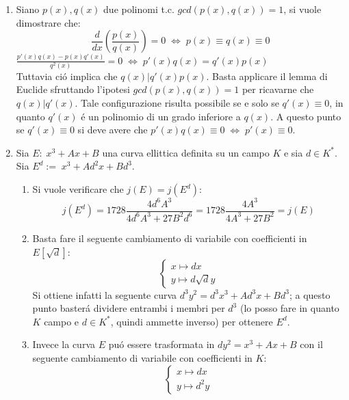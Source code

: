 \documentclass[a4paper]{article}
\newcommand{\sist}{\begin{cases}}
\newcommand{\esist}{\end{cases}}
\newcommand{\ds}{\displaystyle}
\begin{document}
\begin{enumerate}
\item Siano $p(x),q(x)$ due polinomi t.c. $gcd(p(x),q(x))=1$, si vuole dimostrare che:
$$\ds{\frac{d}{dx}\left(\frac{p(x)}{q(x)}\right)=0\;\Leftrightarrow\;p(x)\equiv q(x)\equiv 0}$$
$\ds{\frac{p'(x)q(x)-p(x)q'(x)}{q^2(x)}=0\;\Leftrightarrow\;p'(x)q(x)=q'(x)p(x)}$\\
Tuttavia ci\'o implica che $q(x)|q'(x)p(x)$. Basta applicare il lemma di Euclide sfruttando l'ipotesi $gcd(p(x),q(x))=1$ per ricavarne che $q(x)|q'(x)$. Tale configurazione risulta possibile se e solo se $q'(x)\equiv 0$, in quanto $q'(x)$ \'e un polinomio di un grado inferiore a $q(x)$. A questo punto se $q'(x)\equiv 0$ si deve avere che $p'(x)q(x) \equiv 0 \;\Leftrightarrow\; p'(x)\equiv 0$.\\ 


\item Sia $E:\; x^3+Ax+B$ una curva ellittica definita su un campo $K$ e sia $d\in K^{*}$.\\
Sia $E^d:=\; x^3+Ad^2x+Bd^3$.\\
\begin{enumerate}
\item Si vuole verificare che $j(E)=j(E^{d})$:
$$\ds{j(E^d)=1728\frac{4d^6A^3}{4d^6A^3+27B^2d^6}=1728\frac{4A^3}{4A^3+27B^2}=j(E)}$$
\item Basta fare il seguente cambiamento di variabile con coefficienti in $E[\sqrt{d}]$:
$$\sist
x\longmapsto dx\\
y\longmapsto d\sqrt{d}y
\esist$$
Si ottiene infatti la seguente curva $d^3y^2=d^3x^3+Ad^3x+Bd^3$; a questo punto baster\'a dividere entrambi i 
membri per $d^3$ (lo posso fare in quanto $K$ campo e $d\in K^{*}$, quindi ammette inverso) per ottenere $E^d$.
\item Invece la curva $E$ pu\'o essere trasformata in $dy^2=x^3+Ax+B$ con il seguente cambiamento di variabile con coefficienti in $K$:
$$\sist
x\longmapsto dx\\
y\longmapsto d^2y
\esist$$
\end{enumerate}



\end{enumerate}
\end{document}
